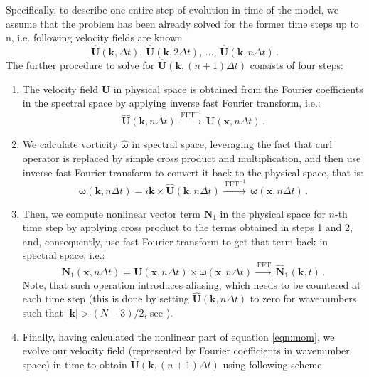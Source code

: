 \documentclass{pracamgren}
\begin{document}
Specifically, to describe one entire step of evolution in time of the model, we assume that the problem has been already solved for the former time steps up to n, i.e.  following velocity fields are known
$$ \mathbf{\hat{U}}(\mathbf{k}, \Delta t) , \, \mathbf{\hat{U}}(\mathbf{k}, 2 \Delta t) , \, \ldots , \, \mathbf{\hat{U}}(\mathbf{k}, n \Delta t) \, .  $$
The further procedure to solve for $\mathbf{\hat{U}}(\mathbf{k}, (n+1) \Delta t)$ consists of four steps:
\begin{enumerate}
\item The velocity field $\mathbf{U}$ in physical space is obtained from the Fourier coefficients in the spectral space by applying inverse fast Fourier transform, i.e.:
\begin{equation}
\mathbf{\hat{U}}(\mathbf{k}, n \Delta t) \xrightarrow{\; \text{FFT}^{-1}} \, \mathbf{U}(\mathbf{x}, n \Delta t) \, .
\label{eqn:psproc-1}
\end{equation}
\item We calculate vorticity $\boldsymbol{\hat{\omega}}$ in spectral space, leveraging the fact that curl operator is replaced by simple cross product and multiplication, and then use inverse fast Fourier transform to convert it back to the physical space, that is:
\begin{equation}
\boldsymbol{\hat{\omega}}(\mathbf{k}, n \Delta t) = i \mathbf{k} \times \mathbf{\hat{U}}(\mathbf{k}, n \Delta t) \xrightarrow{\; \text{FFT}^{-1}} \, \boldsymbol{\omega}(\mathbf{x}, n \Delta t) \, .
\label{eqn:psproc-2}
\end{equation}
\item Then, we compute nonlinear vector term $\mathbf{N}_1$ in the physical space for $n$-th time step by applying cross product to the terms obtained in steps 1 and 2, and, consequently, use fast Fourier transform to get that term back in spectral space, i.e.:
\begin{equation}
\mathbf{N}_1(\mathbf{x}, n \Delta t) = \mathbf{U}(\mathbf{x}, n \Delta t) \times \boldsymbol{\omega}(\mathbf{x}, n \Delta t) \xrightarrow{\; \text{FFT}} \, \mathbf{\hat{N}_1}(\mathbf{k}, t) \, .
\label{eqn:psproc-3}
\end{equation}
Note, that such operation introduces aliasing, which needs to be countered at each time step (this is done by setting $\mathbf{\hat{U}}(\mathbf{k}, n \Delta t)$ to zero for wavenumbers such that ${|\mathbf{k}| > (N - 3) / 2}$, see \textcite{Rosa2015}).
\item Finally, having calculated the nonlinear part of equation \ref{eqn:mom}, we evolve our velocity field (represented by Fourier coefficients in wavenumber space) in time to obtain ${\mathbf{\hat{U}}(\mathbf{k}, (n+1) \Delta t)}$ using following scheme:

\end{enumerate}
\end{document}
